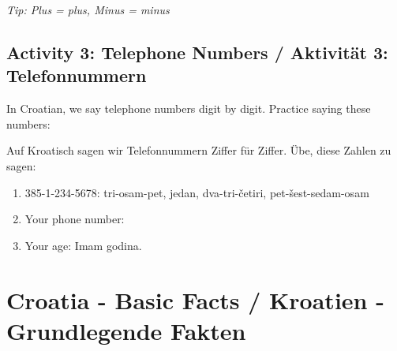 \begin{exercise}
\textit{Tip: Plus = plus, Minus = minus}

\subsection*{Activity 3: Telephone Numbers / Aktivität 3: Telefonnummern}

In Croatian, we say telephone numbers digit by digit. Practice saying these numbers:

Auf Kroatisch sagen wir Telefonnummern Ziffer für Ziffer. Übe, diese Zahlen zu sagen:

\begin{enumerate}
    \item 385-1-234-5678: tri-osam-pet, jedan, dva-tri-četiri, pet-šest-sedam-osam
    \item Your phone number: \underline{\hspace{8cm}}
    \item Your age: Imam \underline{\hspace{3cm}} godina.
\end{enumerate}
\end{exercise}

\section{Croatia - Basic Facts / Kroatien - Grundlegende Fakten}


